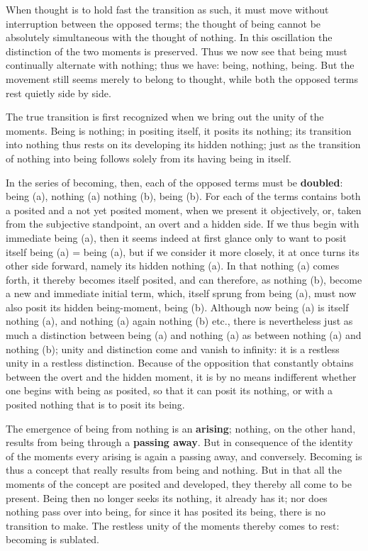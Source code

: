 \documentclass[12pt,a4paper,openany]{book}
\newcommand{\opage}[1]{\marginnote{\footnotesize\textit{[#1]}}}
\begin{document}
When thought is to hold fast the transition as such,
it must move without interruption between the opposed
terms; the thought of being cannot be absolutely simultaneous
with the thought of nothing. In this oscillation
the distinction of the two moments is preserved. Thus we
now see that being must continually alternate with nothing; thus
we have: being, nothing, being. But the movement still seems merely to belong to thought, while both the
opposed terms rest quietly side by side.

The true transition is first recognized when we bring out the unity of the moments. Being is nothing; in
positing itself, it posits its nothing; its
\setcounter{footnote}{0}%
\opage{7}transition into nothing thus rests on its developing its
hidden nothing; just as the transition of nothing into being
follows solely from its having being in itself.

In the series of becoming, then, each of the opposed
terms must be \textbf{doubled}: being (a), nothing (a) \textbar{} nothing (b), being (b). For each of the terms contains
both a posited and a not yet posited moment, when we
present it objectively, or, taken from the subjective standpoint, an overt and a hidden side. If we thus begin with immediate being (a), then
it seems indeed at first glance only to want to posit
itself being (a) = being (a), but if we consider it
more closely, it at once turns its other side forward,
namely its hidden nothing (a). In that nothing (a) comes forth, it thereby becomes itself posited, and can therefore, as
nothing (b), become a new and immediate initial term,
which, itself sprung from being (a), must now also
posit its hidden being-moment, being (b). Although
now being (a) is itself nothing (a), and nothing (a) again
nothing (b) etc., there is nevertheless just as much a distinction
between being (a) and nothing (a) as between nothing (a)
and nothing (b); unity and distinction come and
vanish to infinity: it is a restless unity in
a restless distinction. Because of the opposition that constantly obtains
between the overt and the hidden moment, it is
by no means indifferent whether one begins with being
as posited, so that it can posit its nothing, or with a
posited nothing that is to posit its being.

The emergence of being from nothing is an \textbf{arising}; nothing,
on the other hand, results from being through a \textbf{passing away}. But
in consequence of the identity of the moments every arising
is again a passing away, and conversely.
\setcounter{footnote}{0}%
\opage{8}Becoming is thus a concept that really results
from being and nothing. But in that all the moments of the concept are posited and developed, they thereby all come to be present. Being then no longer seeks its nothing, it already has
it; nor does nothing pass over into being, for
since it has posited its being, there is no transition to
make. The restless unity of the moments thereby comes to
rest: becoming is sublated.
\end{document}
